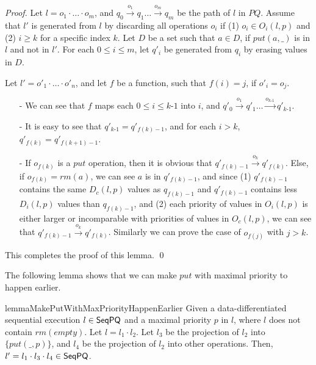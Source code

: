 \begin {proof}
Let $l=o_1 \cdot \ldots \cdot o_m$, and $q_0 \xrightarrow{o_1} q_1 \ldots \xrightarrow{o_m} q_m$ be the path of $l$ in $\textit{PQ}$. Assume that $l'$ is generated from $l$ by discarding all operations $o_i$ if (1) $o_i \in O_i(l,p)$ and (2) $i \geq k$ for a specific index $k$. Let $D$ be a set such that $a \in D$, if $\textit{put}(a,\_)$ is in $l$ and not in $l'$. For each $0 \leq i \leq m$, let $q'_i$ be generated from $q_i$ by erasing values in $D$.

Let $l'=o'_1 \cdot \ldots \cdot o'_n$, and let $f$ be a function, such that $f(i)=j$, if $o'_i = o_j$.

\begin{itemize}
\setlength{\itemsep}{0.5pt}
\item[-] We can see that $f$ maps each $0 \leq i \leq \textit{k-1}$ into $i$, and $q'_0 \xrightarrow{o_1} q'_1 \ldots \xrightarrow{o_{\textit{k-1}}} q'_{\textit{k-1}}$.

\item[-] It is easy to see that $q'_{\textit{k-1}} = q'_{f(k)-1}$, and for each $i>k$, $q'_{f(k)} = q'_{f(k+1)-1}$.

\item[-] If $o_{f(k)}$ is a $\textit{put}$ operation, then it is obvious that $q'_{f(k)-1} \xrightarrow{o_k} q'_{f(k)}$. Else, if $o_{f(k)} = \textit{rm}(a)$, we can see $a$ is in $q'_{f(k)-1}$, and since (1) $q'_{f(k)-1}$ contains the same $D_c(l,p)$ values as $q_{f(k)-1}$ and $q'_{f(k)-1}$ contains less $D_i(l,p)$ values than $q_{f(k)-1}$, and (2) each priority of values in $O_i(l,p)$ is either larger or incomparable with priorities of values in  $O_c(l,p)$, we can see that $q'_{f(k)-1} \xrightarrow{o_k} q'_{f(k)}$. Similarly we can prove the case of $o_{f(j)}$ with $j > k$.
\end{itemize}

This completes the proof of this lemma. \qed
\end {proof}

The following lemma shows that we can make $\textit{put}$ with maximal priority to happen earlier.

\begin{restatable}{lemma}{MakePutWithMaxPriorityHappenEarlier}
\label{lemma:make put with maximal priority happen earlier}
Given a data-differentiated sequential execution $l \in \mathsf{SeqPQ}$ and a maximal priority $p$ in $l$, where $l$ does not contain $\textit{rm}(\textit{empty})$. Let $l=l_1 \cdot l_2$. Let $l_3$ be the projection of $l_2$ into $\{ \textit{put}(\_,p) \}$, and $l_4$ be the projection of $l_2$ into other operations. Then, $l'=l_1 \cdot l_3 \cdot l_4 \in \mathsf{SeqPQ}$.
\end{restatable}

